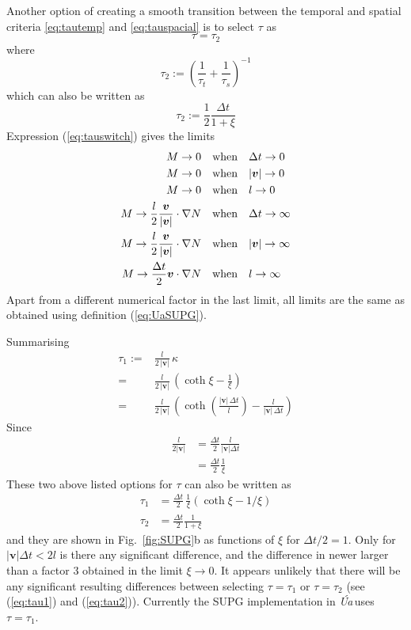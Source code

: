 \documentclass[10pt,a4paper]{book}
\newcommand{\Ua}{\textsl{\'Ua}\,}
\begin{document}
Another option of creating a smooth transition between the temporal
and spatial criteria \ref{eq:tautemp} and \ref{eq:tauspacial} is to select $\tau$ as
\[
\tau=\tau_2
\]
where
\begin{equation}
  \tau_2:=\left ( \frac{1}{\tau_t} + \frac{1}{\tau_s} \right )^{-1}
\end{equation}
which can also be written as
\begin{equation}
  \tau_2:=\frac{1}{2} \frac{\Delta t}{1+ \xi}
\label{eq:tauswitch}
\end{equation}
Expression (\ref{eq:tauswitch}) gives the limits
\begin{align}
M \to 0 &\quad \hbox{when} \quad \Delta t \to 0 \nonumber \\
M \to 0 &\quad \hbox{when} \quad  |\bm{v}| \to 0 \nonumber \\
M \to 0 &\quad \hbox{when} \quad  l \to 0 \nonumber \\
M \to \frac{l}{2} \frac{\bm{v}}{|\bm{v}|} \cdot \nabla N  &\quad \hbox{when} \quad \Delta t \to \infty \nonumber\\
M \to \frac{l}{2} \frac{\bm{v}}{|\bm{v}|} \cdot \nabla N  &\quad \hbox{when} \quad |\bm{v}| \to \infty \nonumber \\
M \to \frac{\Delta t}{2} \bm{v} \cdot \nabla N &\quad \hbox{when} \quad l \to \infty \label{eq:linf2}
\end{align}
Apart from a different numerical factor in the last limit, all limits
are the same as obtained using definition (\ref{eq:UaSUPG}). 



Summarising
\begin{align*}
  \tau_1 :=& \frac{l}{2 \, |\bm{v}|} \, \kappa  \\
  =& \frac{l}{2 \, |\bm{v}|} \,  ( \coth \xi - \frac{1}{\xi} )  \\
            =& \frac{l}{2 \, |\bm{v}|} \,  \left ( \coth \left (\frac{|\bm{v}| \, \Delta t}{l} \right ) - \frac{l}{|\bm{v}| \, \Delta t} \right ) 
\end{align*}
Since
\begin{align*}
  \frac{l}{2 | \bm{v} |} &= \frac{\Delta t}{2} \frac{l}{|\bm{v}| \Delta t} \\
                        &= \frac{\Delta t}{2} \frac{1}{\xi}
\end{align*}
These two above listed options for $\tau$ can also be written as
\begin{align}
\tau_1&=\frac{\Delta t}{2} \, \frac{1}{\xi} \left (\coth \xi - 1/\xi \right ) \label{eq:tau1} \\
\tau_2&=\frac{\Delta t}{2} \frac{1}{1+\xi} \label{eq:tau2}
\end{align}
and they are shown in Fig.~\ref{fig:SUPG}b as functions of $\xi$ for $\Delta t/2=1$. Only
for $|\bm{v}| \Delta t < 2 l$ is there any significant difference, and
the difference in newer larger than a factor 3 obtained in the limit
$\xi \to 0$.  It appears unlikely that there will be any significant
resulting differences between selecting $\tau=\tau_1$ or $\tau=\tau_2$
(see (\ref{eq:tau1}) and (\ref{eq:tau2})). Currently the SUPG
implementation in \Ua uses $\tau=\tau_1$.
\end{document}
